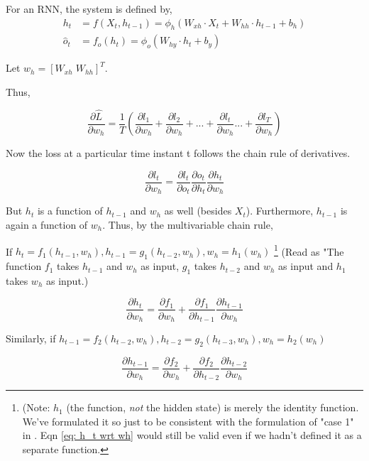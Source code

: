 \documentclass[12pt, letterpaper]{article}
\begin{document}
For an RNN, the system is defined by,
\begin{align}
    h_{t} &= f (X_{t}, h_{t-1}) = \phi_{h}(W_{xh} \cdot X_{t} + W_{hh}\cdot h_{t-1} +b_{h}) \\
    \hat{o}_{t} &= f_{o}(h_{t}) = \phi_{o}(W_{hy}\cdot h_{t} + b_{y})
\end{align}

Let $w_h = [W_{xh}\;W_{hh}]^T$.

Thus,

\begin{equation}
    \frac{\partial \hat{L}}{\partial w_h} = \frac{1}{T} (\frac{\partial l_1}{\partial w_h} + \frac{\partial l_2}{\partial w_h} + ... + \frac{\partial l_t}{\partial w_h} ... + \frac{\partial l_T}{\partial w_h})
\end{equation}

Now the loss at a particular time instant t follows the chain rule of derivatives.

\begin{equation}
    \frac{\partial l_t}{\partial w_h} = \frac{\partial l_t}{\partial o_t}\frac{\partial o_t}{\partial h_t}\frac{\partial h_t}{\partial w_h}
    \label{eq: l_t}
\end{equation}

But $h_t$ is a function of $h_{t-1}$ and $w_h$ as well (besides $X_t$).
Furthermore, $h_{t-1}$ is again a function of $w_h$.
Thus, by the multivariable chain rule,

If $h_t = f_1(h_{t-1}, w_h), h_{t-1}= g_1(h_{t-2}, w_h), w_h = h_1(w_h)$ \footnote{(Note: $h_1$ (the function, \textit{not} the hidden state) is merely the identity
function. We've formulated it so just to be consistent with the
formulation of "case 1" in \cite{multivariate_chain_rule}. Eqn \ref{eq: h_t wrt wh} would still 
be valid even if we hadn't defined it as a separate function.} (Read as "The function $f_1$ takes 
$h_{t-1}$ and $w_h$ as input, $g_1$ takes $h_{t-2}$ and $w_h$ as input and $h_1$ takes $w_h$ as input.)

\begin{equation}
    \frac{\partial h_t}{\partial w_h} = \frac{\partial f_1}{\partial w_h} + \frac{\partial f_1}{\partial h_{t-1}}\frac{\partial h_{t-1}}{\partial w_h}
    \label{eq: h_t wrt wh}
\end{equation}

Similarly, if $h_{t-1} = f_2(h_{t-2}, w_h), h_{t-2}= g_2(h_{t-3}, w_h), w_h = h_2(w_h)$

\begin{equation}
    \frac{\partial h_{t-1}}{\partial w_h} = \frac{\partial f_2}{\partial w_h} + \frac{\partial f_2}{\partial h_{t-2}}\frac{\partial h_{t-2}}{\partial w_h}
    \label{eq: h_t-1 wrt wh}
\end{equation}
\end{document}
